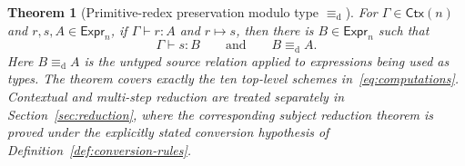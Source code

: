 \documentclass[10pt,reqno]{amsart}
\newtheorem{theorem}{Theorem}[section]
\newcommand{\Expr}{\mathsf{Expr}}
\newcommand{\Ctx}{\mathsf{Ctx}}
\newcommand{\defeq}{\mathrel{\equiv_{\mathrm d}}}
\newcommand{\red}{\mathrel{\longmapsto}}
\begin{document}
\begin{theorem}[Primitive-redex preservation modulo type \(\defeq\)]
\label{thm:redex-preservation}
For \(\Gamma\in\Ctx(n)\) and \(r,s,A\in\Expr_n\), if
\(\Gamma\vdash r:A\) and \(r\red s\), then there is \(B\in\Expr_n\)
such that
\[
                  \Gamma\vdash s:B
                  \qquad\text{and}\qquad B\defeq A.
\tag{5.8}\label{eq:redex-preservation}
\]
Here \(B\defeq A\) is the untyped source relation applied to expressions
being used as types.  The theorem covers exactly the ten top-level schemes
in~\eqref{eq:computations}.  Contextual and multi-step reduction are treated
separately in Section~\ref{sec:reduction}, where the corresponding subject
reduction theorem is proved under the explicitly stated conversion hypothesis
of Definition~\ref{def:conversion-rules}.
\end{theorem}
\end{document}
